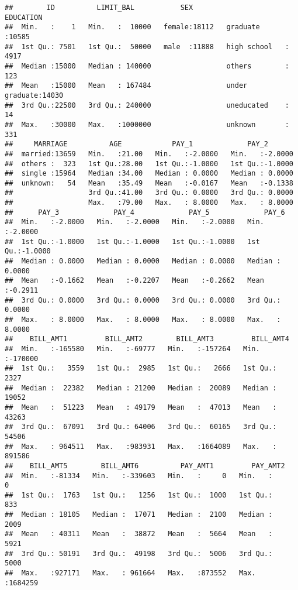\documentclass[]{article}
\begin{document}
\begin{verbatim}
##        ID          LIMIT_BAL           SEX                 EDUCATION    
##  Min.   :    1   Min.   :  10000   female:18112   graduate      :10585  
##  1st Qu.: 7501   1st Qu.:  50000   male  :11888   high school   : 4917  
##  Median :15000   Median : 140000                  others        :  123  
##  Mean   :15000   Mean   : 167484                  under graduate:14030  
##  3rd Qu.:22500   3rd Qu.: 240000                  uneducated    :   14  
##  Max.   :30000   Max.   :1000000                  unknown       :  331  
##     MARRIAGE          AGE            PAY_1             PAY_2        
##  married:13659   Min.   :21.00   Min.   :-2.0000   Min.   :-2.0000  
##  others :  323   1st Qu.:28.00   1st Qu.:-1.0000   1st Qu.:-1.0000  
##  single :15964   Median :34.00   Median : 0.0000   Median : 0.0000  
##  unknown:   54   Mean   :35.49   Mean   :-0.0167   Mean   :-0.1338  
##                  3rd Qu.:41.00   3rd Qu.: 0.0000   3rd Qu.: 0.0000  
##                  Max.   :79.00   Max.   : 8.0000   Max.   : 8.0000  
##      PAY_3             PAY_4             PAY_5             PAY_6        
##  Min.   :-2.0000   Min.   :-2.0000   Min.   :-2.0000   Min.   :-2.0000  
##  1st Qu.:-1.0000   1st Qu.:-1.0000   1st Qu.:-1.0000   1st Qu.:-1.0000  
##  Median : 0.0000   Median : 0.0000   Median : 0.0000   Median : 0.0000  
##  Mean   :-0.1662   Mean   :-0.2207   Mean   :-0.2662   Mean   :-0.2911  
##  3rd Qu.: 0.0000   3rd Qu.: 0.0000   3rd Qu.: 0.0000   3rd Qu.: 0.0000  
##  Max.   : 8.0000   Max.   : 8.0000   Max.   : 8.0000   Max.   : 8.0000  
##    BILL_AMT1         BILL_AMT2        BILL_AMT3         BILL_AMT4      
##  Min.   :-165580   Min.   :-69777   Min.   :-157264   Min.   :-170000  
##  1st Qu.:   3559   1st Qu.:  2985   1st Qu.:   2666   1st Qu.:   2327  
##  Median :  22382   Median : 21200   Median :  20089   Median :  19052  
##  Mean   :  51223   Mean   : 49179   Mean   :  47013   Mean   :  43263  
##  3rd Qu.:  67091   3rd Qu.: 64006   3rd Qu.:  60165   3rd Qu.:  54506  
##  Max.   : 964511   Max.   :983931   Max.   :1664089   Max.   : 891586  
##    BILL_AMT5        BILL_AMT6          PAY_AMT1         PAY_AMT2      
##  Min.   :-81334   Min.   :-339603   Min.   :     0   Min.   :      0  
##  1st Qu.:  1763   1st Qu.:   1256   1st Qu.:  1000   1st Qu.:    833  
##  Median : 18105   Median :  17071   Median :  2100   Median :   2009  
##  Mean   : 40311   Mean   :  38872   Mean   :  5664   Mean   :   5921  
##  3rd Qu.: 50191   3rd Qu.:  49198   3rd Qu.:  5006   3rd Qu.:   5000  
##  Max.   :927171   Max.   : 961664   Max.   :873552   Max.   :1684259  

\end{verbatim}
\end{document}
